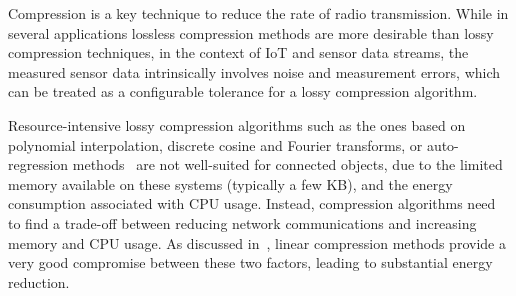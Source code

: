 \begin{comment}

  Summarization is a key data mining concept which involves techniques for finding a compact description of a
  dataset.
  
  Summarization can be viewed as compressing a given set
of transactions into a smaller set of patterns while retaining the maximum possible information. 


\end{comment}





Compression is a key technique to reduce the rate of radio 
transmission.  While in several applications lossless compression 
methods are more desirable than lossy compression techniques, in the 
context of IoT and sensor data streams, the measured sensor data 
intrinsically involves noise and measurement errors, which can 
be treated as a configurable tolerance for a lossy compression algorithm. 

Resource-intensive lossy compression algorithms such as the ones based on 
polynomial interpolation, discrete cosine and Fourier transforms, or 
auto-regression methods~\cite{lu2010optimized} are not well-suited for 
connected objects, due to the limited memory available on 
these systems (typically a few KB), and the energy consumption 
associated with CPU usage. Instead, compression algorithms need 
to find a trade-off between reducing network communications and 
increasing memory and CPU usage. As 
discussed in~\cite{zordan2014performance}, linear compression methods 
provide a very good compromise between these two factors, leading to 
substantial energy reduction.
